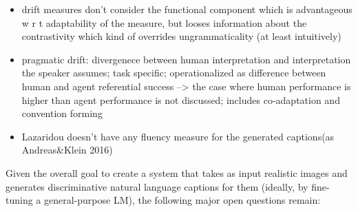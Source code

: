 \documentclass[11pt,letterpaper]{article}
\begin{document}
\begin{itemize}
	\item drift measures don't consider the functional component which is advantageous w r t adaptability of the measure, but looses information about the contrastivity which kind of overrides ungrammaticality (at least intuitively)
	\item pragmatic drift: divergenece between human interpretation and interpretation the speaker assumes; task specific; operationalized as difference between human and agent referential success
	--> the case where human performance is higher than agent performance is not discussed; includes co-adaptation and convention forming	
	\item Lazaridou doesn't have any fluency measure for the generated captions(as Andreas\&Klein 2016) 
\end{itemize}
Given the overall goal to create a system that takes as input realistic images and generates discriminative natural language captions for them (ideally, by fine-tuning a general-purpose LM), the following major open questions remain:
\end{document}
